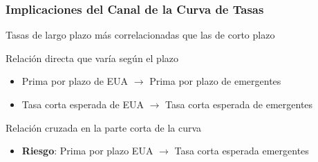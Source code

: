 \documentclass[12pt, aspectratio=169, xcolor=dvipsnames]{beamer}
\begin{document}
\begin{frame}
\frametitle{Implicaciones del Canal de la Curva de Tasas}

Tasas de largo plazo \alert{más correlacionadas} que las de corto plazo

Relación \alert{directa} que varía según el plazo
\begin{itemize}
\item Prima por plazo de EUA \(\rightarrow\) Prima por plazo de emergentes
\item Tasa corta esperada de EUA \(\rightarrow\) Tasa corta esperada de emergentes
\end{itemize}

Relación \alert{cruzada} en la \alert{parte corta} de la curva
\begin{itemize}
\item \textbf{Riesgo}: Prima por plazo EUA \(\rightarrow\) Tasa corta esperada emergentes
\end{itemize}
\end{frame}

\end{document}
